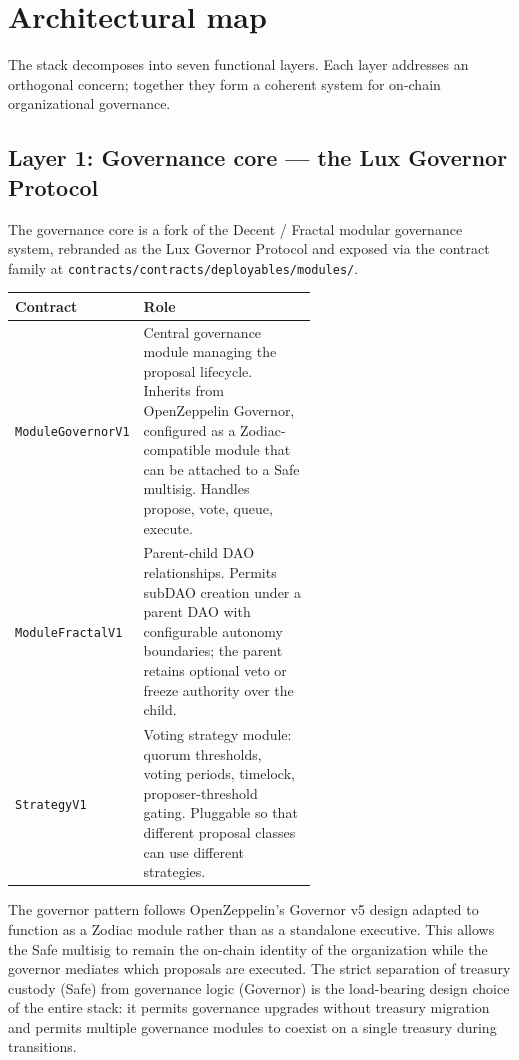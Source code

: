 \documentclass[11pt,letterpaper]{article}
\begin{document}
\section{Architectural map}\label{sec:archmap}

The stack decomposes into seven functional layers. Each layer addresses an orthogonal concern; together they form a coherent system for on-chain organizational governance.

\subsection{Layer 1: Governance core --- the Lux Governor Protocol}

The governance core is a fork of the Decent / Fractal modular governance system, rebranded as the Lux Governor Protocol and exposed via the contract family at \texttt{contracts/contracts/deployables/modules/}.

\begin{longtable}{lp{0.6\linewidth}}
\toprule
\textbf{Contract} & \textbf{Role} \\
\midrule
\texttt{ModuleGovernorV1} & Central governance module managing the proposal lifecycle. Inherits from OpenZeppelin Governor, configured as a Zodiac-compatible module that can be attached to a Safe multisig. Handles propose, vote, queue, execute. \\
\texttt{ModuleFractalV1} & Parent-child DAO relationships. Permits subDAO creation under a parent DAO with configurable autonomy boundaries; the parent retains optional veto or freeze authority over the child. \\
\texttt{StrategyV1} & Voting strategy module: quorum thresholds, voting periods, timelock, proposer-threshold gating. Pluggable so that different proposal classes can use different strategies. \\
\bottomrule
\end{longtable}

The governor pattern follows OpenZeppelin's Governor v5 design adapted to function as a Zodiac module rather than as a standalone executive. This allows the Safe multisig to remain the on-chain identity of the organization while the governor mediates which proposals are executed. The strict separation of treasury custody (Safe) from governance logic (Governor) is the load-bearing design choice of the entire stack: it permits governance upgrades without treasury migration and permits multiple governance modules to coexist on a single treasury during transitions.
\end{document}

